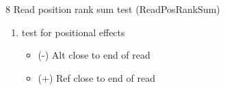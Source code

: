 \documentclass[t,10pt]{beamer}
\begin{document}
\begin{frame}[label={sec:orgheadline15}]{8 Read position rank sum test (ReadPosRankSum)}
\begin{enumerate}
\item test for positional effects 
\begin{itemize}
\item (-) Alt close to end of read
\item (+) Ref close to end of read
\end{itemize}
\end{enumerate}
\end{frame}
\end{document}
